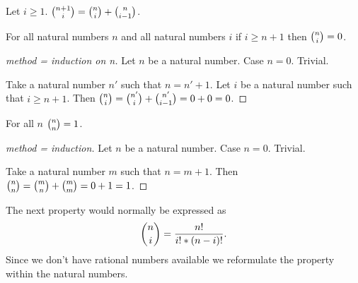 \documentclass[11pt]{article}
\begin{document}
\begin{forthel}
\begin{axiom} Let $i \geq 1$.
${n+1 \choose i} = {n \choose i} + {n \choose i-1}$.
\end{axiom}

\begin{theorem} For all natural numbers $n$ and 
all natural numbers $i$
if $i \geq n + 1$ then ${n \choose i} = 0$.
\end{theorem}
\begin{proof}[method = induction on n]
Let $n$ be a natural number.
Case $n = 0$. Trivial.

Take a natural number $n'$ such that $n = n' + 1$.
Let $i$ be a natural number such that $i \geq n + 1$.
Then ${n \choose i} = {n' \choose i} + {n' \choose i-1} = 0 + 0 = 0$.
\end{proof}


\begin{theorem} For all $n$
${n \choose n} = 1$.
\end{theorem}
\begin{proof}[method = induction]
Let $n$ be a natural number.
Case $n = 0$. Trivial.

Take a natural number $m$ such that $n = m + 1$.
Then ${n \choose n} = {m \choose n} + {m \choose m} = 0 + 1 = 1$.

\end{proof}
\end{forthel}
%
The next property would normally be expressed as
%
$${n \choose i} = \frac{n !}{i ! * (n-i) !}.$$
%
Since we don't have rational numbers available we
reformulate the property within the natural numbers.
%
\end{document}
